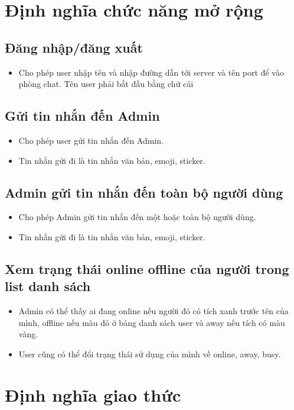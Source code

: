 \documentclass[a4paper]{article}
\begin{document}
\newpage
\tableofcontents
\newpage
\listoffigures
\newpage

\section{Định nghĩa chức năng mở rộng}
	\subsection{Đăng nhập/đăng xuất}
	\begin{itemize}
		\item Cho phép user nhập tên và nhập đường dẫn tới server và tên port để vào phòng chat. Tên user phải bắt đầu bằng chữ cái
	\end{itemize}
	\subsection{Gửi tin nhắn đến Admin}
	\begin{itemize}
		\item Cho phép user gửi tin nhắn đến Admin.
		\item Tin nhắn gửi đi là tin nhắn văn bản, emoji, sticker.
	\end{itemize}
	\subsection{Admin gửi tin nhắn đến toàn bộ người dùng}
	\begin{itemize}
		\item Cho phép Admin gửi tin nhắn đến một hoặc toàn bộ người dùng.
		\item Tin nhắn gửi đi là tin nhắn văn bản, emoji, sticker.
	\end{itemize}
	\subsection{Xem trạng thái online offline của người trong list danh sách}
	\begin{itemize}
		\item Admin có thể thấy ai đang online nếu người đó có tích xanh trước tên của mình, offline nếu màu đỏ ở bảng danh sách user và away nếu tích có màu vàng.
		\item User cũng có thể đổi trạng thái sử dụng của mình về online, away, busy.
	\end{itemize}

\section{Định nghĩa giao thức}
\end{document}
